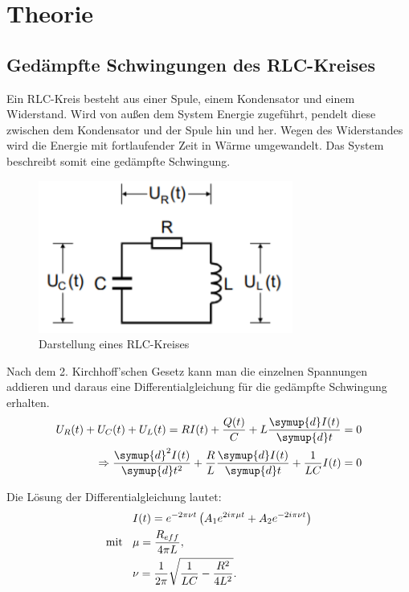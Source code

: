 \section{Theorie}
\label{sec:Theorie}

\subsection{Gedämpfte Schwingungen des RLC-Kreises}
Ein RLC-Kreis besteht aus einer Spule, einem Kondensator und einem Widerstand. Wird von außen
dem System Energie zugeführt, pendelt diese zwischen dem Kondensator und der Spule hin und her.
Wegen des Widerstandes wird die Energie mit fortlaufender Zeit in Wärme umgewandelt. Das System beschreibt
somit eine gedämpfte Schwingung.

\begin{figure}[H]
  \centering
  \includegraphics[height=5cm]{RLC-Kreis(Grundsaetzlich).PNG}
  \caption{Darstellung eines RLC-Kreises}
  \label{fig:RLC-Kreis(mit Widerstand)}
\end{figure}

Nach dem 2. Kirchhoff'schen Gesetz kann man die einzelnen Spannungen addieren und daraus eine Differentialgleichung
für die gedämpfte Schwingung erhalten.
\begin{align}
  U_R(t) + U_C(t) + U_L(t) = RI(t) +\frac{Q(t)}{C} + L\frac{\symup{d}I(t)}{\symup{d}t} = 0 \\
  \Rightarrow \frac{\symup{d}^2I(t)}{\symup{d}t^2} +\frac{R}{L}\frac{\symup{d}I(t)}{\symup{d}t} + \frac{1}{LC}I(t) = 0
\end{align}

Die Lösung der Differentialgleichung lautet:
\begin{align}
  &I(t) = e^{-2\pi \nu t} \left(A_1 e^{2i\pi \mu t} + A_2 e^{-2i\pi \nu t}\right)   \\
\text{mit} \:\:\:\:  &\mu = \frac{R_{eff}}{4\pi L} , \\
  &\nu = \frac{1}{2\pi} \sqrt{\frac{1}{LC} - \frac{R^2}{4L^2}} \notag.
\end{align}

